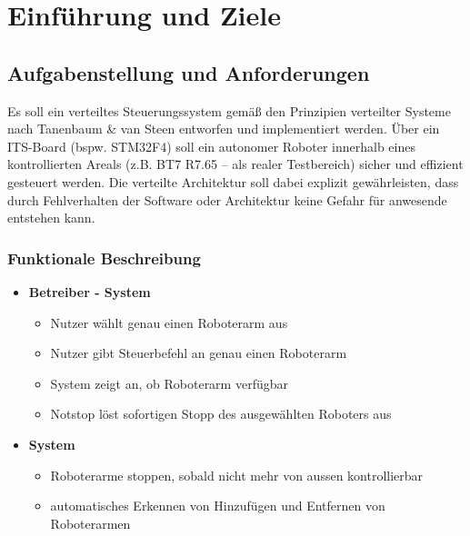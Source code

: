 \chapter{Einführung und Ziele}

\section{Aufgabenstellung und Anforderungen}

Es soll ein verteiltes Steuerungssystem gemäß den Prinzipien verteilter Systeme nach Tanenbaum \& van Steen entworfen und implementiert werden. Über ein ITS-Board (bspw. STM32F4) soll ein autonomer Roboter innerhalb eines kontrollierten Areals (z.B. BT7 R7.65 – als realer Testbereich) sicher und effizient gesteuert werden. Die verteilte Architektur soll dabei explizit gewährleisten, dass durch Fehlverhalten der Software oder Architektur keine Gefahr für anwesende entstehen kann.

\subsection*{Funktionale Beschreibung}


\begin{itemize}
	
	\item \textbf{Betreiber - System}
		\begin{itemize}
			\item Nutzer wählt genau einen Roboterarm aus
			\item Nutzer gibt Steuerbefehl an genau einen Roboterarm
			\item System zeigt an, ob Roboterarm verfügbar
			\item Notstop löst sofortigen Stopp des ausgewählten Roboters aus
		\end{itemize}
		
	\item \textbf{System}
		\begin{itemize}
			\item Roboterarme stoppen, sobald nicht mehr von aussen kontrollierbar
			\item automatisches Erkennen von Hinzufügen und Entfernen von Roboterarmen
			
		\end{itemize}
	
\end{itemize}

